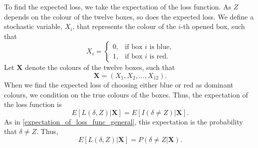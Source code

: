 To find the expected loss, we take the expectation of the loss function. As $Z$ depends on the colour of the twelve boxes, so does the expected loss. We define a stochastic variable, $X_i$, that represents the colour of the $i$-th opened box, such that 
\begin{equation*}
    X_i =
    \begin{cases}
        0,& \text{if box }i \text{ is blue,}\\
        1,& \text{if box }i \text{ is red.}
    \end{cases}
\end{equation*}
Let $\textbf{X}$ denote the colours of the twelve boxes, such that
\begin{equation*}
    \textbf{X} = (X_1,X_2,...,X_{12}).
\end{equation*}
When we find the expected loss of choosing either blue or red as dominant colours, we condition on the true colours of the boxes. Thus, the expectation of the loss function is
\begin{equation*}
    E[L(\delta,Z)|\textbf{X}] = E[I(\delta \neq Z)|\textbf{X}].
\end{equation*}
As in \eqref{expectation_of_loss_func_general}, this expectation is the probability that $\delta \neq Z$. Thus,
\begin{equation*}
    E[L(\delta,Z)|\textbf{X}] = P(\delta \neq Z|\textbf{X}).
\end{equation*}






\begin{comment}
Absolute error loss. Special case of that is the 0-1-loss. that can be expressed as an indicator function. And then the expectation of the indicator function. 


Maybe the loss functions for choosing blue and red should be
\begin{equation*}
    L(\delta =0) = I(d=0)
\end{equation*}
and 
\begin{equation*}
    L(\delta =1) = I(d=1)
\end{equation*}
and for unlimited choosing to open the next box
\begin{equation*}
    L_i(\delta_i=2,d_i)=\alpha+L_{i+1}(\delta_{i+1},d_{i+1})?
\end{equation*}

$\Delta$ as the action space and $\delta$ as the parameter?

hva er en loss function? says something about the cost of an action tied/in relation to(?) to a parameter. Typical input is the action and a parameter. 
Typisk eksempel? 0-1-loss? and indicator variables

example. 
\end{comment}


